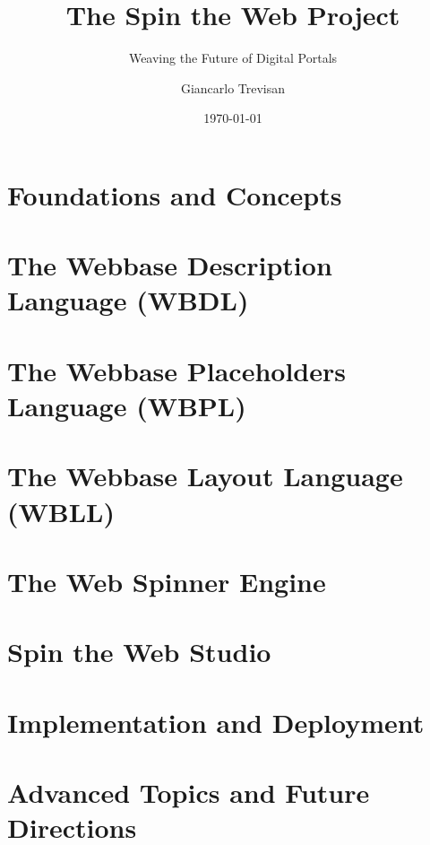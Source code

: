 \documentclass[11pt,openright,twoside,a4paper]{book}
\title{The Spin the Web Project}
\subtitle{Weaving the Future of Digital Portals}
\author{Giancarlo Trevisan}
\date{\today}
\begin{document}
\frontmatter




\tableofcontents

\mainmatter

\part{Foundations and Concepts}







\part{The Webbase Description Language (WBDL)}





\part{The Webbase Placeholders Language (WBPL)}


\part{The Webbase Layout Language (WBLL)}


\part{The Web Spinner Engine}


\part{Spin the Web Studio}


\part{Implementation and Deployment}


\part{Advanced Topics and Future Directions}



\backmatter


\printindex
\end{document}
